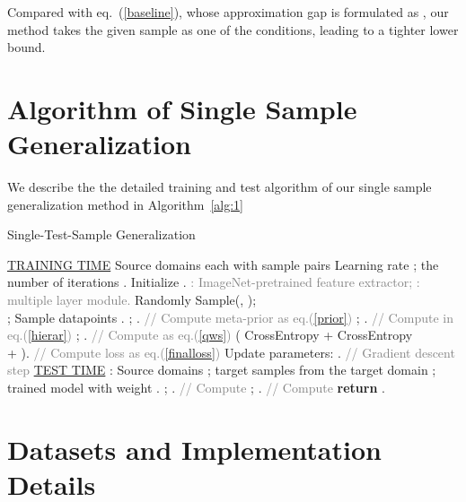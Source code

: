 \documentclass{article} \usepackage[table]{xcolor}
\begin{document}
Compared with eq.~(\ref{baseline}), whose approximation gap is formulated as , our method takes the given sample  as one of the conditions, leading to a tighter lower bound.


\section{Algorithm of Single Sample Generalization}
\label{algorithm}

We describe the the detailed training and test algorithm of our single sample generalization method in Algorithm~\ref{alg:1}
\begin{algorithm}[h]
\small
\caption{Single-Test-Sample Generalization}
\label{alg:1}
\begin{algorithmic}
\STATE \underline{TRAINING TIME}
 Source domains  each with  sample pairs 
 Learning rate ; the number of iterations .
\STATE Initialize . \textcolor{gray}{: ImageNet-pretrained feature extractor; 
: multiple layer module.}
\STATE   Randomly Sample(, ); 
\\
    ;
\STATE Sample datapoints .
\STATE ; . \textcolor{gray}{// Compute meta-prior  as eq.(\ref{prior})}
\STATE ; . \textcolor{gray}{// Compute  in eq.(\ref{hierar})}
\STATE ; . \textcolor{gray}{// Compute  as eq.(\ref{qws})}
\STATE  \Big( CrossEntropy  +  CrossEntropy  
\\ \qquad +  \Big). \textcolor{gray}{// Compute loss as eq.(\ref{finalloss})}
\STATE Update parameters: . \textcolor{gray}{// Gradient descent step}
\ENDFOR
\STATE {\hrulefill}
\STATE \underline{TEST TIME}
: Source domains ; target samples  from the target domain ; trained model with weight .
\STATE ; . \textcolor{gray}{// Compute }
\STATE ; . \textcolor{gray}{// Compute }
\STATE \textbf{return} .
\end{algorithmic}
\end{algorithm}

\section{Datasets and Implementation Details}
\label{appimp}
\end{document}
